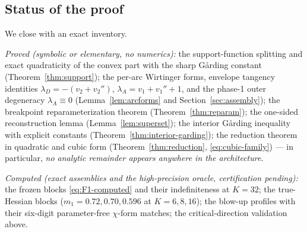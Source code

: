 \documentclass[11pt]{amsart}
\theoremstyle{plain}
\theoremstyle{definition}
\begin{document}
\subsection{Status of the proof}\label{sec:status}

We close with an exact inventory.

\emph{Proved (symbolic or elementary, no numerics):}
the support-function splitting and exact quadraticity of the convex
part with the sharp G\aa rding constant
(Theorem~\ref{thm:support}); the per-arc Wirtinger forms, envelope
tangency identities $\lambda_{D}=-(v_{2}+v_{2}'')$,
$\lambda_{A}=v_{1}+v_{1}''+1$, and the phase-1 outer degeneracy
$\lambda_{A}\equiv0$ (Lemma~\ref{lem:arcforms} and
Section~\ref{sec:assembly}); the breakpoint reparameterization
theorem (Theorem~\ref{thm:reparam}); the one-sided reconstruction
lemma (Lemma~\ref{lem:superset}); the interior G\aa rding inequality
with explicit constants (Theorem~\ref{thm:interior-garding}); the
reduction theorem in quadratic and cubic form
(Theorem~\ref{thm:reduction}, \eqref{eq:cubic-family}) --- in
particular, \emph{no analytic remainder appears anywhere in the
architecture}.

\emph{Computed (exact assemblies and the high-precision oracle,
certification pending):} the frozen blocks
\eqref{eq:F1-computed} and their indefiniteness at $K=32$; the
true-Hessian blocks ($m_{1}=0.72,0.70,0.596$ at $K=6,8,16$); the
blow-up profiles with their six-digit parameter-free $\chi$-form
matches; the critical-direction validation above.
\end{document}
